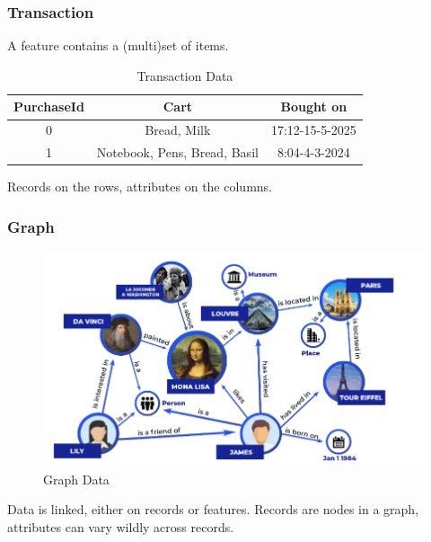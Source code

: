 \subsubsection{Transaction}
A feature contains a (multi)set of items.

\begin{table}[h!]
\centering
\begin{tabular}{ccc}
\toprule
\textbf{PurchaseId} & \textbf{Cart} & \textbf{Bought on} \\
\midrule
0 & Bread, Milk & 17:12-15-5-2025 \\
1 & Notebook, Pens, Bread, Basil & 8:04-4-3-2024 \\
\bottomrule
\end{tabular}
\caption{Transaction Data}
\end{table}

Records on the rows, attributes on the columns.

\subsubsection{Graph}
\begin{figure}[htbp]
   \centering
   \includegraphics{images/01/graph.png}
   \caption{Graph Data}
   \label{fig:01/graph}
\end{figure}
Data is linked, either on records or features.
Records are nodes in a graph, attributes can vary wildly across records.

\newpage
